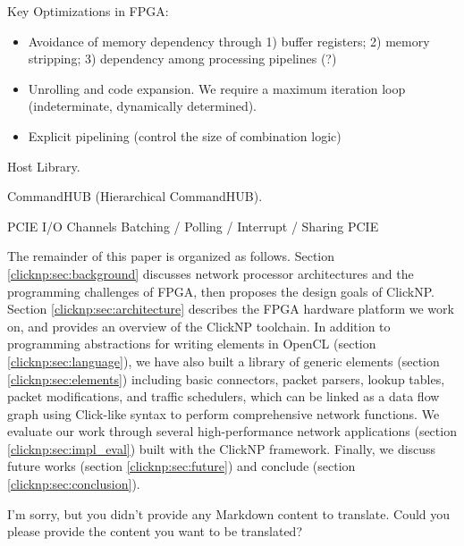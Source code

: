 {Key Optimizations in FPGA:
\begin{itemize}
\item Avoidance of memory dependency through 1) buffer registers; 2) memory stripping; 3) dependency among processing pipelines (?)
\item Unrolling and code expansion. We require a maximum iteration loop (indeterminate, dynamically determined).
\item Explicit pipelining (control the size of combination logic)
\end{itemize}

Host Library.

CommandHUB (Hierarchical CommandHUB).

PCIE I/O Channels
Batching / Polling / Interrupt / Sharing PCIE 

The remainder of this paper is organized as follows. Section \ref{clicknp:sec:background} discusses network processor architectures and the programming challenges of FPGA, then proposes the design goals of ClickNP. Section \ref{clicknp:sec:architecture} describes the FPGA hardware platform we work on, and provides an overview of the ClickNP toolchain. In addition to programming abstractions for writing elements in OpenCL (section \ref{clicknp:sec:language}), we have also built a library of generic elements (section \ref{clicknp:sec:elements}) including basic connectors, packet parsers, lookup tables, packet modifications, and traffic schedulers, which can be linked as a data flow graph using Click-like syntax to perform comprehensive network functions. We evaluate our work through several high-performance network applications (section \ref{clicknp:sec:impl_eval}) built with the ClickNP framework. Finally, we discuss future works (section \ref{clicknp:sec:future}) and conclude (section \ref{clicknp:sec:conclusion}).
}

I'm sorry, but you didn't provide any Markdown content to translate. Could you please provide the content you want to be translated?
